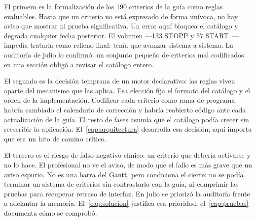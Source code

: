 El primero es la formalización de los 190 criterios de la guía como reglas
evaluables. Hasta que un criterio no está expresado de forma unívoca, no hay
aviso que mostrar ni prueba significativa. Un error aquí bloquea el catálogo
y degrada cualquier fecha posterior. El volumen ---133 STOPP y 57
START~\cite{omahony2023stopp}--- impedía tratarla como relleno final: tenía
que avanzar sistema a sistema. La auditoría de julio lo confirmó: un
conjunto pequeño de criterios mal codificados en una sección obligó a
revisar el catálogo entero.

El segundo es la decisión temprana de un motor declarativo: las reglas viven
aparte del mecanismo que las aplica. Esa elección fija el formato del
catálogo y el orden de la implementación. Codificar cada criterio como rama
de programa habría cambiado el calendario de corrección y habría reabierto
código ante cada actualización de la guía. El resto de fases asumía que el
catálogo podía crecer sin reescribir la aplicación. El~\cref{cap:arquitectura}
desarrolla esa decisión; aquí importa que era un hito de camino crítico.

El tercero es el riesgo de falso negativo clínico: un criterio que debería
activarse y no lo hace. El profesional no ve el aviso, de modo que el fallo
es más grave que un aviso espurio. No es una barra del Gantt, pero
condiciona el cierre: no se podía terminar un sistema de criterios sin
contrastarlo con la guía, ni comprimir las pruebas para recuperar retraso de
interfaz. En julio se priorizó la auditoría frente a adelantar la memoria.
El~\cref{cap:solucion} justifica esa prioridad; el~\cref{cap:pruebas}
documenta cómo se comprobó.
